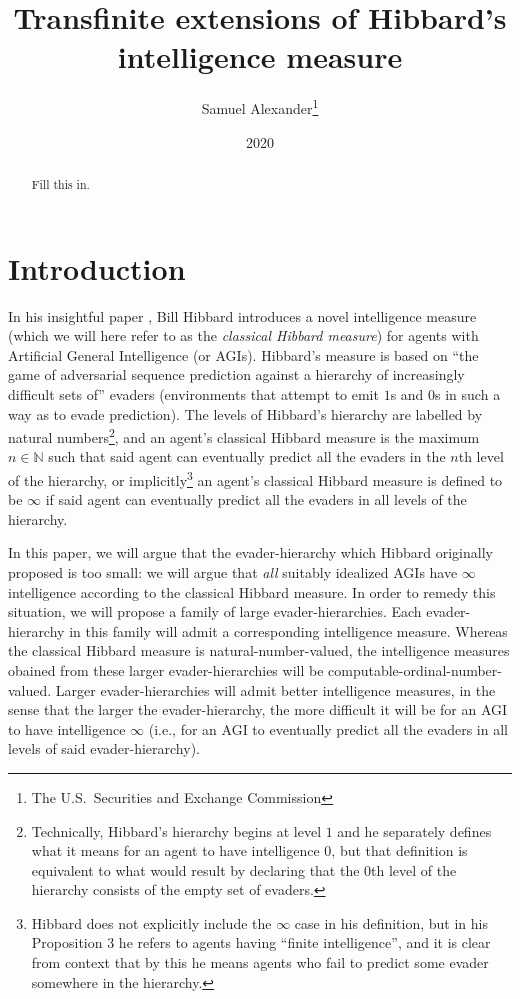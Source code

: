 \documentclass{article}
\title{Transfinite extensions of Hibbard's intelligence measure}
\author{Samuel Alexander\thanks{The U.S.\ Securities and Exchange Commission}}
\date{2020}
\begin{document}
\maketitle

\begin{abstract}
    Fill this in.
\end{abstract}

\section{Introduction}

In his insightful paper \cite{hibbard}, Bill Hibbard introduces a novel
intelligence measure (which we will here refer to as the \emph{classical Hibbard measure})
for agents with Artificial General Intelligence (or AGIs).
Hibbard's measure is based on ``the game of adversarial sequence prediction
against a hierarchy of increasingly difficult sets of'' evaders (environments that attempt
to emit $1$s and $0$s in such a way as to evade prediction).
The levels of Hibbard's hierarchy are labelled by natural numbers\footnote{Technically,
Hibbard's hierarchy begins at level $1$ and he separately defines what it means for
an agent to have intelligence $0$, but that definition is equivalent to what would result
by declaring that the $0$th level of the hierarchy consists of the empty set of evaders.}, and
an agent's classical Hibbard measure is the maximum $n\in\mathbb N$ such that
said agent can eventually predict all the evaders in the $n$th level of the hierarchy,
or implicitly\footnote{Hibbard does not explicitly include the $\infty$ case in his
definition, but in his Proposition 3 he refers to agents having ``finite intelligence'', and
it is clear from context that by this he means agents who fail to predict some evader
somewhere in the hierarchy.} an agent's classical Hibbard measure is defined to be $\infty$
if said agent can eventually predict all the evaders in all levels of the hierarchy.

In this paper, we will argue that the evader-hierarchy which Hibbard originally proposed is
too small: we will argue that \emph{all} suitably idealized AGIs have $\infty$
intelligence according to the classical Hibbard measure. In order to remedy this
situation, we will propose a family of large evader-hierarchies. Each
evader-hierarchy in this family will admit a corresponding intelligence measure.
Whereas the classical Hibbard
measure is natural-number-valued, the intelligence measures obained from these larger
evader-hierarchies will be computable-ordinal-number-valued. Larger evader-hierarchies
will admit better intelligence measures, in the sense that the larger the evader-hierarchy,
the more difficult it will be for an AGI to have intelligence $\infty$ (i.e., for an
AGI to eventually predict all the evaders in all levels of said evader-hierarchy).
\end{document}
